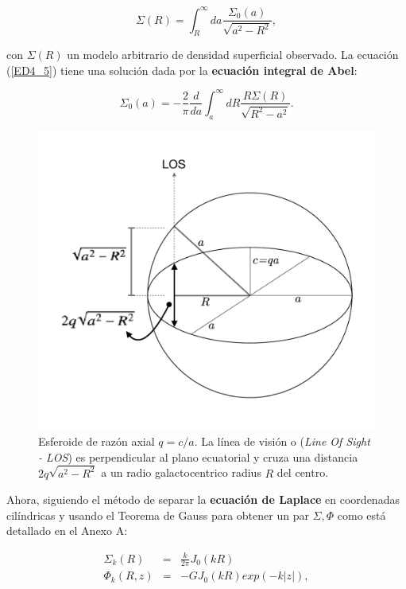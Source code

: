 \begin{equation}
\label{ED4_5}
\Sigma (R) = \int_R^\infty da \frac{\Sigma_0(a)}{\sqrt{a^2-R^2}}, \end{equation}

con  $\Sigma(R)$ un modelo arbitrario de densidad superficial observado. La ecuación (\ref{ED4_5}) tiene una solución dada por la \textbf{ecuación integral de Abel}:

\begin{equation}
\label{ED5}
\Sigma_0(a) = -\frac{2}{\pi} \frac{d}{da} \int_a^{\infty} dR \frac{R\Sigma (R)}{\sqrt{R^2-a^2}}.
\end{equation}

\begin{figure}
  \centering
    \includegraphics[width=0.95\columnwidth]{Kap2/galaxy_spheroid.pdf}
  \caption{ Esferoide de razón axial $q=c/a$. La línea de visión o (\emph{Line Of Sight - LOS}) es perpendicular al plano ecuatorial y cruza una distancia $2q\sqrt{a^2-R^2}$ a un radio galactocentrico radius $R$ del centro.}
  \label{fig:Fig_Galaxy_Spheroid}
\end{figure}

Ahora, siguiendo el método de separar la \textbf{ecuación de Laplace} en coordenadas cilíndricas y usando el Teorema de Gauss para obtener un par $\Sigma, \Phi$ como está detallado en \cite{C93} el Anexo A:

\begin{eqnarray*}
\Sigma_k (R) &=& \frac{k}{2\pi} J_0 (kR) \\
\Phi_k (R,z) &=& -G J_0(kR) exp(-k|z| ),
\end{eqnarray*}

